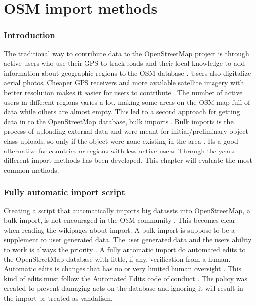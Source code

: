  \chapter{OSM import methods}

\subsection{Introduction}
The traditional way to contribute data to the OpenStreetMap project is through active users who use their GPS to track roads and their local knowledge to add information about geographic regions to the OSM database \cite{Zielstra2013}. Users also digitalize aerial photos. Cheaper GPS receivers and more available satellite imagery with better resolution makes it easier for users to contribute \cite{Chilton}. The number of active users in different regions varies a lot, making some areas on the OSM map full of data while others are almost empty. This led to a second approach for getting data in to the OpenStreetMap database, bulk imports \cite{Zielstra2013}.  Bulk imports is the process of uploading external data and were meant for initial/preliminary object class uploads, so only if the object were none existing in the area  \cite{Zielstra2013}.  Its a good alternative for countries or regions with less active users. Through the years different import methods has been developed. This chapter will evaluate the most common methods. 

\subsection{Fully automatic import script}
Creating a script that automatically imports big datasets into OpenStreetMap, a bulk import, is not encouraged in the OSM community \cite{Zielstra2013}. This becomes clear when reading the wikipages about import. A bulk import is suppose to be a supplement to user generated data. The user generated data and the users ability to work is always the priority \cite{OSMimport}. A fully automatic import do automated edits to the OpenStreetMap database with little, if any, verification from a human. Automatic edits is changes that has no or very limited human oversight \cite{OSMAutiEdit}. This kind of edits must follow the Automated Edits code of conduct \cite{OSMAutomaticEdits}. The policy was created to prevent damaging acts on the database and ignoring it will result in the import be treated as vandalism. 

